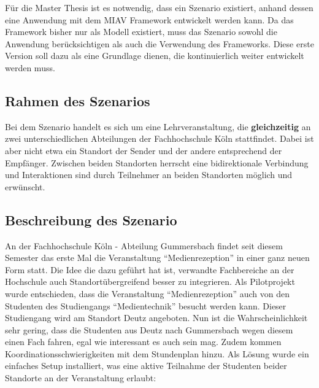   Für die Master Thesis ist es notwendig, dass ein Szenario existiert, anhand dessen eine Anwendung mit dem MIAV Framework entwickelt werden kann. Da das Framework bisher nur als Modell existiert, muss das Szenario sowohl die Anwendung berücksichtigen als auch die Verwendung des Frameworks. Diese erste Version soll dazu als eine Grundlage dienen, die kontinuierlich weiter entwickelt werden muss.

\subsection{Rahmen des Szenarios} %
\label{ssec:rahmen_des_szenarios}

  Bei dem Szenario handelt es sich um eine Lehrveranstaltung, die \textbf{gleichzeitig} an zwei unterschiedlichen Abteilungen der Fachhochschule Köln stattfindet. Dabei ist aber nicht etwa ein Standort der Sender und der andere entsprechend der Empfänger. Zwischen beiden Standorten herrscht eine bidirektionale Verbindung und Interaktionen sind durch Teilnehmer an beiden Standorten möglich und erwünscht.


\subsection{Beschreibung des Szenario} %
\label{sub:beschreibung_des_szenario}

  An der Fachhochschule Köln - Abteilung Gummersbach findet seit diesem Semester das erste Mal die Veranstaltung "`Medienrezeption"' in einer ganz neuen Form statt. Die Idee die dazu geführt hat ist, verwandte Fachbereiche an der Hochschule auch Standortübergreifend besser zu integrieren. Als Pilotprojekt wurde entschieden, dass die Veranstaltung "`Medienrezeption"' auch von den Studenten des Studiengangs "`Medientechnik"' besucht werden kann. Dieser Studiengang wird am Standort Deutz angeboten. Nun ist die Wahrscheinlichkeit sehr gering, dass die Studenten aus Deutz nach Gummersbach wegen diesem einen Fach fahren, egal wie interessant es auch sein mag. Zudem kommen Koordinationsschwierigkeiten mit dem Stundenplan hinzu. Als Lösung wurde ein einfaches Setup installiert, was eine aktive Teilnahme der Studenten beider Standorte an der Veranstaltung erlaubt:

